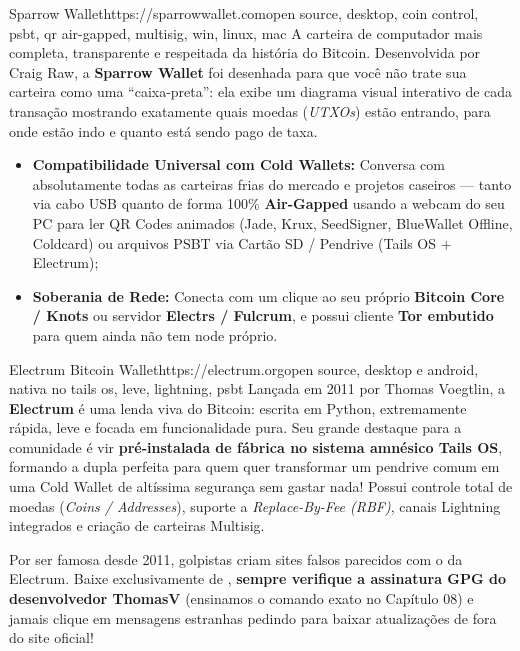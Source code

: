 \documentclass{pousadaguide}
\begin{document}
\begin{ferramenta}[goat,logo=sparrow]{Sparrow Wallet}{https://sparrowwallet.com}{open source, desktop, coin control, psbt, qr air-gapped, multisig, win, linux, mac}
A carteira de computador mais completa, transparente e respeitada da história do Bitcoin. Desenvolvida por Craig Raw, a \textbf{Sparrow Wallet} foi desenhada para que você não trate sua carteira como uma ``caixa-preta'': ela exibe um diagrama visual interativo de cada transação mostrando exatamente quais moedas (\emph{UTXOs}) estão entrando, para onde estão indo e quanto está sendo pago de taxa.
\begin{itemize}
  \item \textbf{Compatibilidade Universal com Cold Wallets:} Conversa com absolutamente todas as carteiras frias do mercado e projetos caseiros — tanto via cabo USB quanto de forma 100\% \textbf{Air-Gapped} usando a webcam do seu PC para ler QR Codes animados (Jade, Krux, SeedSigner, BlueWallet Offline, Coldcard) ou arquivos PSBT via Cartão SD / Pendrive (Tails OS + Electrum);
  \item \textbf{Soberania de Rede:} Conecta com um clique ao seu próprio \textbf{Bitcoin Core / Knots} ou servidor \textbf{Electrs / Fulcrum}, e possui cliente \textbf{Tor embutido} para quem ainda não tem node próprio.
\end{itemize}
\end{ferramenta}

\begin{ferramenta}[goat,logo=electrum]{Electrum Bitcoin Wallet}{https://electrum.org}{open source, desktop e android, nativa no tails os, leve, lightning, psbt}
Lançada em 2011 por Thomas Voegtlin, a \textbf{Electrum} é uma lenda viva do Bitcoin: escrita em Python, extremamente rápida, leve e focada em funcionalidade pura. Seu grande destaque para a comunidade é vir \textbf{pré-instalada de fábrica no sistema amnésico Tails OS}, formando a dupla perfeita para quem quer transformar um pendrive comum em uma Cold Wallet de altíssima segurança sem gastar nada! Possui controle total de moedas (\emph{Coins / Addresses}), suporte a \emph{Replace-By-Fee (RBF)}, canais Lightning integrados e criação de carteiras Multisig. 
\end{ferramenta}

\begin{atencao}
Por ser famosa desde 2011, golpistas criam sites falsos parecidos com o da Electrum. Baixe exclusivamente de , \textbf{sempre verifique a assinatura GPG do desenvolvedor ThomasV} (ensinamos o comando exato no Capítulo 08) e jamais clique em mensagens estranhas pedindo para baixar atualizações de fora do site oficial!
\end{atencao}
\end{document}
